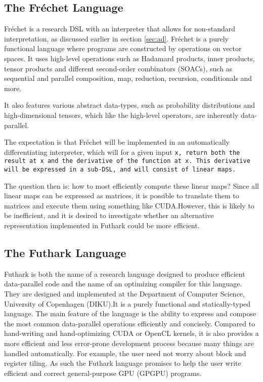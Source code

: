 \subsection{The Fréchet Language} Fréchet\cite{popl} is a research DSL with an
interpreter that allows for non-standard interpretation, as discussed earlier in
section \autoref{sec:ad}.  Fréchet is a purely functional language where programs
are constructed by operations on vector spaces.  It uses high-level operations
such as Hadamard products, inner products, tensor products and different
second-order combinators (SOACs), such as sequential and parallel composition,
map, reduction, recursion, conditionals and more.

It also features various abstract data-types, such as probability distributions
and high-dimensional tensors, which like the high-level operators, are
inherently data-parallel.

The expectation is that Fréchet will be implemented in an automatically
differentiating interpreter, which will for a given input \tt{x}, return both
the result at \tt{x} and the derivative of the function at \tt{x}. This
derivative will be expressed in a sub-DSL, and will consist of linear maps.

The question then is:  how to most efficiently compute these linear maps?  Since
all linear maps can be expressed as matrices, it is possible to translate them
to matrices and execute them using something like CUDA.\@  However, this is
likely to be inefficient, and it is desired to investigate whether an
alternative representation implemented in Futhark could be more efficient.

\subsection{The Futhark Language}  Futhark\cite{futhark} is both the name of a
research language designed to produce efficient data-parallel code and the name
of an optimizing compiler for this language.  They are designed and implemented
at the Department of Computer Science, University of Copenhagen (DIKU).\@  It is
a purely functional and statically-typed language. The main feature of the
language is the ability to express and compose the most common data-parallel
operations efficiently and concisely.  Compared to hand-writing and
hand-optimizing CUDA or OpenCL kernels, it is also provides a more efficient and
less error-prone development process because many things are handled
automatically.  For example, the user need not worry about block and register
tiling.  As such the Futhark language promises to help the user write efficient
and correct general-purpose GPU (GPGPU) programs.

